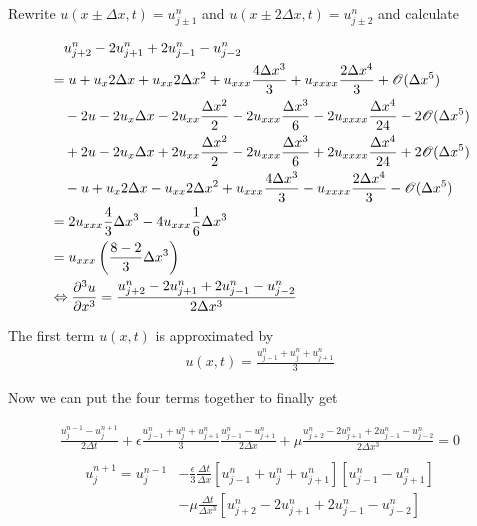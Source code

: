 \documentclass[
	a4paper, %
	10pt, %
]{CSUniSchoolLabReport}
\begin{document}
Rewrite $u(x\pm\Delta x, t) = u_{j\pm1}^n$ and $u(x\pm2\Delta x, t) = u_{j\pm2}^n$ and calculate

\begin{align*}
	&\quad u_{j+2}^n - 2u_{j+1}^n + 2u_{j-1}^n - u_{j-2}^n \\ 
	&=  u + u_{x} 2\Delta x + u_{xx} 2 \Delta x^2+ u_{xxx} \frac{4\Delta x^3}{3} + u_{xxxx}\frac{2\Delta x^4}{3} + \mathscr{O}(\Delta x^5) \\
	&\quad- 2u - 2u_{x} \Delta x - 2u_{xx} \frac{\Delta x^2}{2}- 2u_{xxx} \frac{\Delta x^3}{6} - 2u_{xxxx}\frac{\Delta x^4}{24} - 2\mathscr{O}(\Delta x^5) \\
	&\quad + 2u - 2u_{x} \Delta x + 2u_{xx} \frac{\Delta x^2}{2} - 2u_{xxx} \frac{\Delta x^3}{6} + 2u_{xxxx}\frac{\Delta x^4}{24} + 2\mathscr{O}(\Delta x^5) \\
	&\quad -u + u_{x} 2\Delta x - u_{xx} 2 \Delta x^2+ u_{xxx} \frac{4\Delta x^3}{3} - u_{xxxx}\frac{2\Delta x^4}{3} - \mathscr{O}(\Delta x^5)\\
	&= 2 u_{xxx} \frac{4}{3} \Delta x^3 - 4 u_{xxx} \frac{1}{6} \Delta x^3 \\
	&= u_{xxx} \left( \frac{8-2}{3} \Delta x^3  \right) \\
	&\Leftrightarrow \pdv{^3u}{x^3} = \frac{u_{j+2}^n - 2u_{j+1}^n + 2u_{j-1}^n - u_{j-2}^n}{2 \Delta x^3}
\end{align*}


The first term $u(x,t)$ is approximated by 
\begin{align*}
	u(x,t) = \frac{u_{j-1}^n + u_j^n + u_{j+1}^n}{3}
\end{align*}

Now we can put the four terms together to finally get

\begin{align*}
	\frac{u_{j}^{n-1}-u_{j}^{n+1}}{2\Delta t} + \epsilon \frac{u_{j-1}^n + u_j^n + u_{j+1}^n}{3} \frac{u_{j-1}^n-u_{j+1}^n}{2\Delta x} + \mu \frac{u_{j+2}^n - 2u_{j+1}^n + 2u_{j-1}^n - u_{j-2}^n}{2 \Delta x^3} = 0 \\
\end{align*}
\begin{align}
	u_j^{n+1} = u_j^{n-1} &- \frac{\epsilon}{3} \frac{\Delta t}{\Delta x} [u_{j-1}^n + u_j^n + u_{j+1}^n] [u_{j-1}^n-u_{j+1}^n] 
	\\ &- \mu \frac{\Delta t}{\Delta x^3} [u_{j+2}^n - 2u_{j+1}^n + 2u_{j-1}^n - u_{j-2}^n]\nonumber
\end{align}


\end{document}
